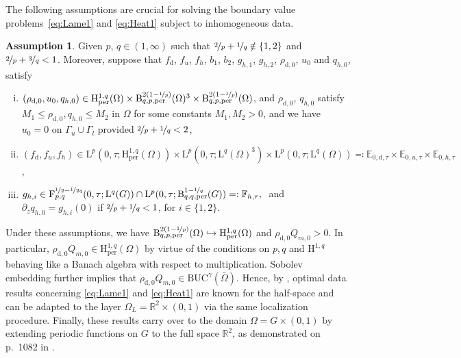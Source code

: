 \documentclass[10pt]{amsart}
\theoremstyle{plain}
\theoremstyle{definition}
\newtheorem{asu}[asu]{Assumption}
\theoremstyle{thm}
\numberwithin{equation}{section}
\newcommand{\rL}{\mathrm{L}}
\newcommand{\rLq}{\rL^q}
\newcommand{\rLp}{\rL^p}
\newcommand{\rH}{\mathrm{H}}
\newcommand{\rB}{\mathrm{B}}
\newcommand{\rF}{\mathrm{F}}
\newcommand{\R}{\mathbb{R}}
\newcommand{\E}{\mathbb{E}}
\newcommand{\F}{\mathbb{F}}
\newcommand{\del}{\partial}
\newcommand{\per}{\mathrm{per}}
\newcommand{\dz}{\del_z}
\newcommand{\Gal}{\Gamma_l}
\newcommand{\Gau}{\Gamma_u}
\newcommand{\rd}{\mathrm{d}}
\begin{document}
The following assumptions are crucial for solving the boundary value problems~\eqref{eq:Lame1} and \eqref{eq:Heat1} subject to inhomogeneous data.

\begin{asu}\label{assu:data}
Given $p$, $q \in (1,\infty)$ such that $\nicefrac{2}{p} + \nicefrac{1}{q} \notin \{1,2\}$ and $\nicefrac{2}{p}+ \nicefrac{3}{q}<1$. Moreover, suppose that $f_\rd$, $f_u$, $f_h$, $b_1$, $b_2$, $g_{h,1}$, $g_{h,2}$, $\rho_{\rd,0}$, $u_0$ and $q_{h,0}$, satisfy
\begin{enumerate}[(i)]
    \item $(\rho_{\rd,0}, u_0, q_{h,0}) \in \rH_\per^{1,q}(\Omega) \times \rB_{q,p,\per}^{2(1-\nicefrac{1}{p})}(\Omega)^3 \times \rB_{q,p,\per}^{2(1-\nicefrac{1}{p})}(\Omega)$, 
    and $\rho_{\rd,0}$, $q_{h,0}$ satisfy $M_1 \leq \rho_{\rd,0}, q_{h,0} \leq M_2$ in $\Omega$ for  some constants $M_1, M_2 >0$, and we have $u_0 = 0$ on $\Gau \cup \Gal$ provided $\nicefrac{2}{p} + \nicefrac{1}{q} < 2$,
    \item $(f_\rd,f_u,f_h) \in \rLp(0,\tau;\rH_\per^{1,q}(\Omega)) \times  \rLp(0,\tau;\rLq(\Omega)^3) \times \rLp(0,\tau;\rLq(\Omega)) \eqqcolon \E_{0,\rd,\tau} \times \E_{0,u,\tau} \times \E_{0,h,\tau}$,
    \item $g_{h,i} \in \rF_{p,q}^{\nicefrac{1}{2}-\nicefrac{1}{2q}}(0,\tau;\rLq(G)) \cap \rLp(0,\tau;\rB_{q,q, \per}^{1 - \nicefrac{1}{q}}(G))=:\F_{h,\tau},\ $  and \ $\dz q_{h,0} = g_{h,i}(0)$ if $\nicefrac{2}{p} + \nicefrac{1}{q} < 1$, for $i\in \{ 1,2\}$.
\end{enumerate}
\end{asu}

Under these assumptions, we have
$\rB^{2\left(1-\nicefrac{1}{p}\right)}_{q,p,\per}(\Omega) \hookrightarrow \rH^{1,q}_\per(\Omega)$ and $\rho_{\rd,0} Q_{m,0} > 0$.
In particular, $\rho_{\rd,0} Q_{m,0} \in \rH^{1,q}_\per(\Omega)$ by virtue of the conditions on $p,q$ and $\rH^{1,q}$ behaving like a Banach algebra with respect to multiplication. Sobolev embedding further implies that
$\rho_{\rd,0} Q_{m,0} \in \mathrm{BUC}^\gamma(\bar{\Omega})$.
Hence, by \cite{DHP:07}, optimal data results concerning \eqref{eq:Lame1} and \eqref{eq:Heat1} are known for the half-space and can be adapted to the layer $\Omega_L = \R^2 \times (0,1)$ via the same localization procedure.
Finally, these results carry over to the domain
$\Omega = G \times (0,1)$
by extending periodic functions on $G$ to the full space $\R^2$, as demonstrated on p.~1082 in \cite{HK:16}.
\end{document}
